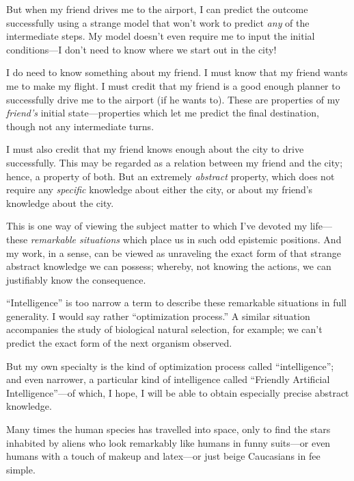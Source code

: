 {{
 But when my friend drives me to the airport, I can predict the
outcome successfully using a strange model that won't
work to predict \textit{any} of the intermediate steps. My model
doesn't even require me to input the initial
conditions---I don't need to know where we start out in
the city!}

{
 I do need to know something about my friend. I must know that my
friend wants me to make my flight. I must credit that my friend is a
good enough planner to successfully drive me to the airport (if he
wants to). These are properties of my \textit{friend's}
initial state---properties which let me predict the final destination,
though not any intermediate turns.}

{
 I must also credit that my friend knows enough about the city to
drive successfully. This may be regarded as a relation between my
friend and the city; hence, a property of both. But an extremely
\textit{abstract} property, which does not require any
\textit{specific} knowledge about either the city, or about my
friend's knowledge about the city.}

{
 This is one way of viewing the subject matter to which
I've devoted my life---these \textit{remarkable
situations} which place us in such odd epistemic positions. And my
work, in a sense, can be viewed as unraveling the exact form of that
strange abstract knowledge we can possess; whereby, not knowing the
actions, we can justifiably know the consequence.}

{
 ``Intelligence'' is too narrow
a term to describe these remarkable situations in full generality. I
would say rather ``optimization
process.'' A similar situation accompanies the study
of biological natural selection, for example; we can't
predict the exact form of the next organism observed.}

{
 But my own specialty is the kind of optimization process called
``intelligence''; and even narrower,
a particular kind of intelligence called ``Friendly
Artificial Intelligence''---of which, I hope, I will
be able to obtain especially precise abstract knowledge.}

\myendsectiontext


{
 Many times the human species has travelled into space, only to
find the stars inhabited by aliens who look remarkably like humans in
funny suits---or even humans with a touch of makeup and latex---or just
beige Caucasians in fee simple.}

}
